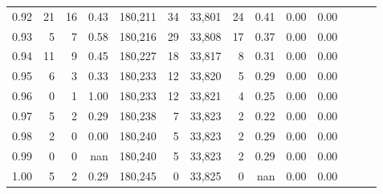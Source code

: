 \begin{tabular}{rrrrrrrrrrrrrr}
0.92 &     21 &     16 &  0.43 &  180,211 &       34 &  33,801 &      24 &  0.41 &  0.00 &      0.00 \\
0.93 &      5 &      7 &  0.58 &  180,216 &       29 &  33,808 &      17 &  0.37 &  0.00 &      0.00 \\
0.94 &     11 &      9 &  0.45 &  180,227 &       18 &  33,817 &       8 &  0.31 &  0.00 &      0.00 \\
0.95 &      6 &      3 &  0.33 &  180,233 &       12 &  33,820 &       5 &  0.29 &  0.00 &      0.00 \\
0.96 &      0 &      1 &  1.00 &  180,233 &       12 &  33,821 &       4 &  0.25 &  0.00 &      0.00 \\
0.97 &      5 &      2 &  0.29 &  180,238 &        7 &  33,823 &       2 &  0.22 &  0.00 &      0.00 \\
0.98 &      2 &      0 &  0.00 &  180,240 &        5 &  33,823 &       2 &  0.29 &  0.00 &      0.00 \\
0.99 &      0 &      0 &   nan &  180,240 &        5 &  33,823 &       2 &  0.29 &  0.00 &      0.00 \\
1.00 &      5 &      2 &  0.29 &  180,245 &        0 &  33,825 &       0 &   nan &  0.00 &      0.00 \\
\bottomrule
\end{tabular}
